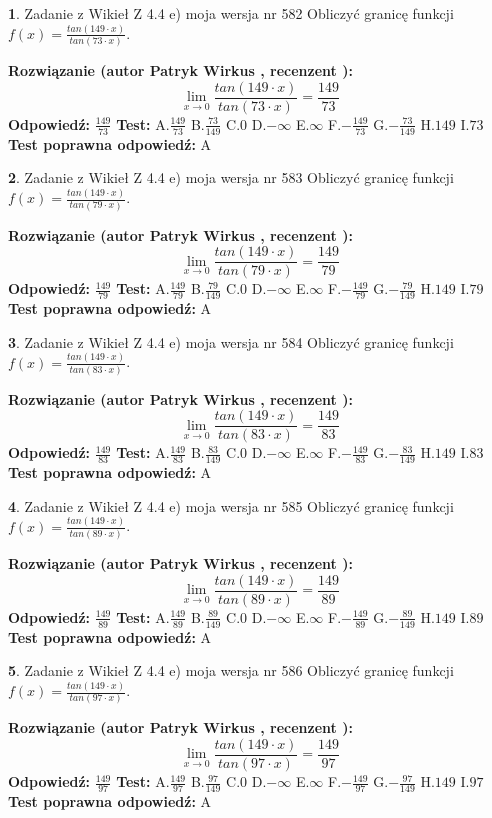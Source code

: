 \documentclass[12pt, a4paper]{article}
\theoremstyle{definition} %
\newtheorem{zad}{}
\newcommand{\zadStart}[1]{\begin{zad}#1\newline}
\newcommand{\zadStop}{\end{zad}}
\newcommand{\rozwStart}[2]{\noindent \textbf{Rozwiązanie (autor #1 , recenzent #2): }\newline}
\newcommand{\rozwStop}{\newline}
\newcommand{\odpStart}{\noindent \textbf{Odpowiedź:}\newline}
\newcommand{\odpStop}{\newline}
\newcommand{\testStart}{\noindent \textbf{Test:}\newline}
\newcommand{\testStop}{\newline}
\newcommand{\kluczStart}{\noindent \textbf{Test poprawna odpowiedź:}\newline}
\newcommand{\kluczStop}{\newline}
\begin{document}
\zadStart{Zadanie z Wikieł Z 4.4 e) moja wersja nr 582}
Obliczyć granicę funkcji $f(x)=\frac{tan(149\cdot x)}{tan(73\cdot x)}$.
\zadStop
\rozwStart{Patryk Wirkus}{}
$$\lim\limits_{x\to 0}\frac{tan(149\cdot x)}{tan(73\cdot x)}=
\frac{149}{73}$$
\rozwStop
\odpStart
$\frac{149}{73}$
\odpStop
\testStart
A.$\frac{149}{73}$
B.$\frac{73}{149}$
C.$0$
D.$-\infty$
E.$\infty$
F.$-\frac{149}{73}$
G.$-\frac{73}{149}$
H.$149$
I.$73$
\testStop
\kluczStart
A
\kluczStop



\zadStart{Zadanie z Wikieł Z 4.4 e) moja wersja nr 583}
Obliczyć granicę funkcji $f(x)=\frac{tan(149\cdot x)}{tan(79\cdot x)}$.
\zadStop
\rozwStart{Patryk Wirkus}{}
$$\lim\limits_{x\to 0}\frac{tan(149\cdot x)}{tan(79\cdot x)}=
\frac{149}{79}$$
\rozwStop
\odpStart
$\frac{149}{79}$
\odpStop
\testStart
A.$\frac{149}{79}$
B.$\frac{79}{149}$
C.$0$
D.$-\infty$
E.$\infty$
F.$-\frac{149}{79}$
G.$-\frac{79}{149}$
H.$149$
I.$79$
\testStop
\kluczStart
A
\kluczStop



\zadStart{Zadanie z Wikieł Z 4.4 e) moja wersja nr 584}
Obliczyć granicę funkcji $f(x)=\frac{tan(149\cdot x)}{tan(83\cdot x)}$.
\zadStop
\rozwStart{Patryk Wirkus}{}
$$\lim\limits_{x\to 0}\frac{tan(149\cdot x)}{tan(83\cdot x)}=
\frac{149}{83}$$
\rozwStop
\odpStart
$\frac{149}{83}$
\odpStop
\testStart
A.$\frac{149}{83}$
B.$\frac{83}{149}$
C.$0$
D.$-\infty$
E.$\infty$
F.$-\frac{149}{83}$
G.$-\frac{83}{149}$
H.$149$
I.$83$
\testStop
\kluczStart
A
\kluczStop



\zadStart{Zadanie z Wikieł Z 4.4 e) moja wersja nr 585}
Obliczyć granicę funkcji $f(x)=\frac{tan(149\cdot x)}{tan(89\cdot x)}$.
\zadStop
\rozwStart{Patryk Wirkus}{}
$$\lim\limits_{x\to 0}\frac{tan(149\cdot x)}{tan(89\cdot x)}=
\frac{149}{89}$$
\rozwStop
\odpStart
$\frac{149}{89}$
\odpStop
\testStart
A.$\frac{149}{89}$
B.$\frac{89}{149}$
C.$0$
D.$-\infty$
E.$\infty$
F.$-\frac{149}{89}$
G.$-\frac{89}{149}$
H.$149$
I.$89$
\testStop
\kluczStart
A
\kluczStop



\zadStart{Zadanie z Wikieł Z 4.4 e) moja wersja nr 586}
Obliczyć granicę funkcji $f(x)=\frac{tan(149\cdot x)}{tan(97\cdot x)}$.
\zadStop
\rozwStart{Patryk Wirkus}{}
$$\lim\limits_{x\to 0}\frac{tan(149\cdot x)}{tan(97\cdot x)}=
\frac{149}{97}$$
\rozwStop
\odpStart
$\frac{149}{97}$
\odpStop
\testStart
A.$\frac{149}{97}$
B.$\frac{97}{149}$
C.$0$
D.$-\infty$
E.$\infty$
F.$-\frac{149}{97}$
G.$-\frac{97}{149}$
H.$149$
I.$97$
\testStop
\kluczStart
A
\kluczStop
\end{document}
